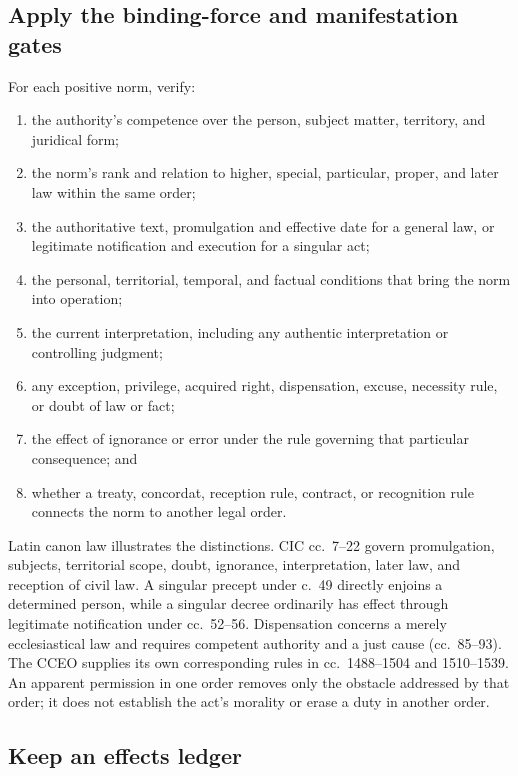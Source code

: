 \subsection{Apply the binding-force and manifestation gates}

For each positive norm, verify:

\begin{enumerate}
\item the authority's competence over the person, subject matter, territory, and juridical form;
\item the norm's rank and relation to higher, special, particular, proper, and later law within the same order;
\item the authoritative text, promulgation and effective date for a general law, or legitimate notification and execution for a singular act;
\item the personal, territorial, temporal, and factual conditions that bring the norm into operation;
\item the current interpretation, including any authentic interpretation or controlling judgment;
\item any exception, privilege, acquired right, dispensation, excuse, necessity rule, or doubt of law or fact;
\item the effect of ignorance or error under the rule governing that particular consequence; and
\item whether a treaty, concordat, reception rule, contract, or recognition rule connects the norm to another legal order.
\end{enumerate}

Latin canon law illustrates the distinctions. CIC cc.~7--22 govern promulgation, subjects, territorial scope, doubt, ignorance, interpretation, later law, and reception of civil law. A singular precept under c.~49 directly enjoins a determined person, while a singular decree ordinarily has effect through legitimate notification under cc.~52--56. Dispensation concerns a merely ecclesiastical law and requires competent authority and a just cause (cc.~85--93). The CCEO supplies its own corresponding rules in cc.~1488--1504 and 1510--1539. An apparent permission in one order removes only the obstacle addressed by that order; it does not establish the act's morality or erase a duty in another order.

\subsection{Keep an effects ledger}

